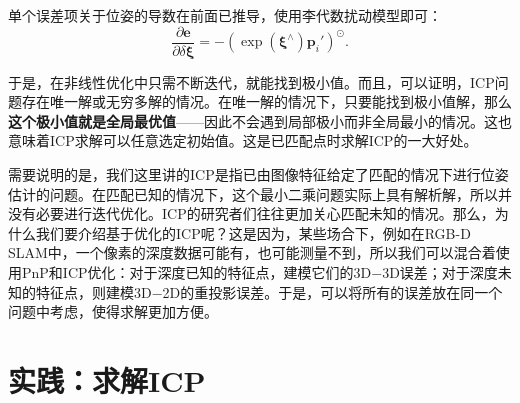 单个误差项关于位姿的导数在前面已推导，使用李代数扰动模型即可：
\begin{equation}
\frac{{\partial \bm{e}}}{{\partial \delta \boldsymbol{\xi} }} =  - {\left( {\exp \left( {{ \boldsymbol{\xi} ^ \wedge }} \right){{\bm{p}}_i}'} \right)^ \odot }.
\end{equation}

于是，在非线性优化中只需不断迭代，就能找到极小值。而且，可以证明\textsuperscript{\cite{Barfoot2016}}，ICP问题存在唯一解或无穷多解的情况。在唯一解的情况下，只要能找到极小值解，那么\textbf{这个极小值就是全局最优值}——因此不会遇到局部极小而非全局最小的情况。这也意味着ICP求解可以任意选定初始值。这是已匹配点时求解ICP的一大好处。

需要说明的是，我们这里讲的ICP是指已由图像特征给定了匹配的情况下进行位姿估计的问题。在匹配已知的情况下，这个最小二乘问题实际上具有解析解\textsuperscript{\cite{Faugeras1986, Horn1987, Sharp2002}}，所以并没有必要进行迭代优化。ICP的研究者们往往更加关心匹配未知的情况。那么，为什么我们要介绍基于优化的ICP呢？这是因为，某些场合下，例如在RGB-D SLAM中，一个像素的深度数据可能有，也可能测量不到，所以我们可以混合着使用PnP和ICP优化：对于深度已知的特征点，建模它们的3D−3D误差；对于深度未知的特征点，则建模3D−2D的重投影误差。于是，可以将所有的误差放在同一个问题中考虑，使得求解更加方便。

\section{实践：求解ICP}
